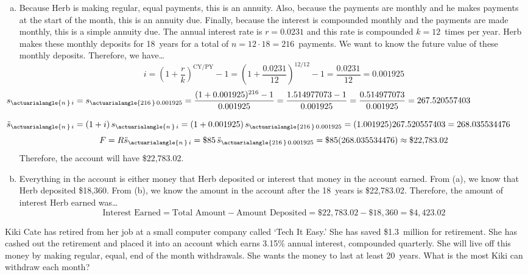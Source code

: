 \documentclass[12pt,letterpaper]{exam}
\begin{document}
\begin{questions}
{\begin{enumerate}[(a)]
\item Because Herb is making regular, equal payments, this is an annuity. Also, because the payments are monthly and he makes payments at the start of the month, this is an annuity due. Finally, because the interest is compounded monthly and the payments are made monthly, this is a simple annuity due. The annual interest rate is $r= 0.0231$ and this rate is compounded $k= 12$~times per year. Herb makes these monthly deposits for 18~years for a total of $n= 12 \cdot 18= 216$~payments. We want to know the future value of these monthly deposits. Therefore, we have\dots
	\[
	i= \left(1 + \dfrac{r}{k} \right)^{\text{CY}/\text{PY}} - 1= \left(1 + \dfrac{0.0231}{12} \right)^{12/12} - 1= \dfrac{0.0231}{12}= 0.001925
	\]
	\[
	\begin{aligned}
	\hspace{-1.25cm} s_{\actuarialangle{n\,}\, i}&= s_{\actuarialangle{216\,}\, 0.001925}= \dfrac{(1 + 0.001925)^{216} - 1}{0.001925}= \dfrac{1.514977073 - 1}{0.001925}= \dfrac{0.514977073}{0.001925}= 267.520557403 \\[0.3cm]
	\hspace{-1.25cm} \ddot{s}_{\actuarialangle{n\,}\, i}&= (1 + i)\, s_{\actuarialangle{n\,}\, i}= (1 + 0.001925)\, s_{\actuarialangle{216\,}\, 0.001925}= (1.001925) 267.520557403= 268.035534476	
	\end{aligned}
	\]
	\[
	F= R \ddot{s}_{\actuarialangle{n\,}\, i}= \$85\, \ddot{s}_{\actuarialangle{216\,}\, 0.001925}= \$85(268.035534476) \approx \$22,\!783.02
	\] 
Therefore, the account will have \$22,783.02. \pspace

\item Everything in the account is either money that Herb deposited or interest that money in the account earned. From (a), we know that Herb deposited \$18,360. From (b), we know the amount in the account after the 18~years is \$22,783.02. Therefore, the amount of interest Herb earned was\dots
	\[
	\text{Interest Earned}= \text{Total Amount} - \text{Amount Deposited}= \$22,\!783.02 - \$18,\!360= \$4,\!423.02
	\]
\end{enumerate}
}



\newpage
\question[10] Kiki Cate has retired from her job at a small computer company called `Tech It Easy.' She has saved \$1.3~million for retirement. She has cashed out the retirement and placed it into an account which earns 3.15\% annual interest, compounded quarterly. She will live off this money by making regular, equal, end of the month withdrawals. She wants the money to last at least 20~years. What is the most Kiki can withdraw each month? \pspace


\end{questions}
\end{document}
